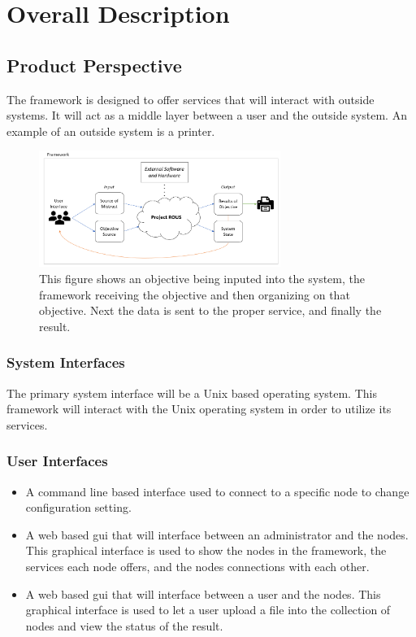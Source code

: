 \documentclass[draftclsnofoot, onecolumn, compsoc, 10pt]{IEEEtran}
\begin{document}
\section{Overall Description}
\subsection{Product Perspective}
The framework is designed to offer services that will interact with outside systems. It will act as a middle layer between a user and the outside system. An example of an outside system is a printer. 
\begin{figure}[!htb]
\centering
	\includegraphics[width=0.7\textwidth]{img_perspective2}
	\caption{This figure shows an objective being inputed into the system, the framework receiving the objective and then organizing on that objective. Next the data is sent to the proper service, and finally the result.}
  
\end{figure}

\subsubsection{System Interfaces}
The primary system interface will be a Unix based operating system. This framework will interact with the Unix operating system in order to utilize its services. 

\subsubsection{User Interfaces}
\begin{itemize}
\item A command line based interface used to connect to a specific node to change configuration setting.\\
\item A web based gui that will interface between an administrator and the nodes. This graphical interface is used to show the nodes in the framework, the services each node offers, and the nodes connections with each other.\\ 
\item A web based gui that will interface between a user and the nodes. This graphical interface is used to let a user upload a file into the collection of nodes and view the status of the result.
\end{itemize}
\end{document}
